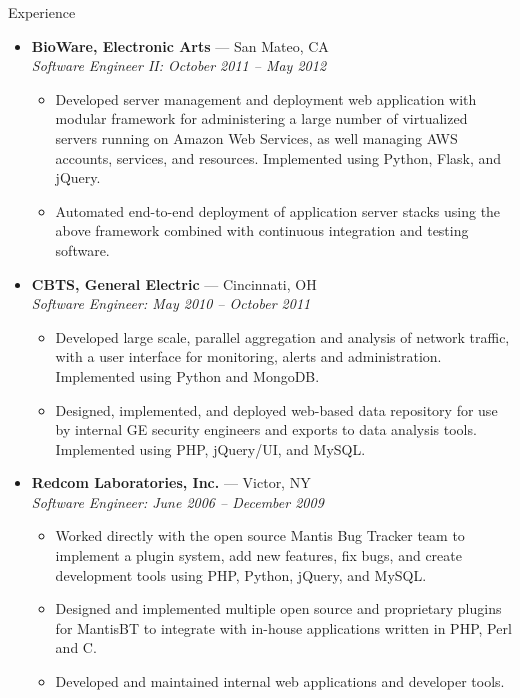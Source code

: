 \documentclass[11pt,oneside]{article}
\newenvironment{ressection}[1]{
	\vspace{8pt}
	{\fontfamily{phv}\selectfont\Large#1}
	\begin{itemize}
	\vspace{3pt}
}{
	\end{itemize}
}
\newcommand{\ressubitem}[1]{
	\vspace{-1pt}
	\item \begin{flushleft} #1 \end{flushleft}
}
\newcommand{\resbigitem}[3]{
	\vspace{-5pt}
	\item
	\textbf{#1} --- #2 \\
	\textit{#3}
}
\newenvironment{ressubsec}[3]{
	\resbigitem{#1}{#2}{#3}
	\vspace{-2pt}
	\begin{itemize}
}{
	\end{itemize}
}
\begin{document}
\begin{ressection}{Experience}

	\begin{ressubsec}{BioWare, Electronic Arts}{San Mateo, CA}
	{Software Engineer II: October 2011 -- May 2012}
		\ressubitem{Developed server management and deployment web application with
		modular framework for administering a large number of virtualized servers
		running on Amazon Web Services, as well managing AWS accounts, services, and
		resources.  Implemented using Python, Flask, and jQuery.}
		\ressubitem{Automated end-to-end deployment of application server stacks using
			the above framework combined with continuous integration and testing software.}
	\end{ressubsec}

	\begin{ressubsec}{CBTS, General Electric}{Cincinnati, OH}
	{Software Engineer: May 2010 -- October 2011}
		\ressubitem{Developed large scale, parallel aggregation and analysis of network
		traffic, with a user interface for monitoring, alerts and administration.
		Implemented using Python and MongoDB.}
		\ressubitem{Designed, implemented, and deployed web-based data repository
		for use by internal GE security engineers and exports to data analysis tools.
		Implemented using PHP, jQuery/UI, and MySQL.}
	\end{ressubsec}


	\begin{ressubsec}{Redcom Laboratories, Inc.}{Victor, NY}
	{Software Engineer: June 2006 -- December 2009}
		\ressubitem{Worked directly with the open source Mantis Bug Tracker team to implement
		a plugin system, add new features, fix bugs, and create development tools using PHP, Python,
		jQuery, and MySQL.}
		\ressubitem{Designed and implemented multiple open source and proprietary plugins for MantisBT
		to integrate with in-house applications written in PHP, Perl and C.}
		\ressubitem{Developed and maintained internal web applications and developer tools.}
	\end{ressubsec}


\end{ressection}
\end{document}
